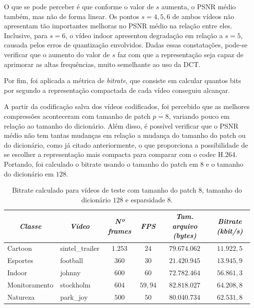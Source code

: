 \documentclass[cic,tc]{iiufrgs}
\begin{document}
O que se pode perceber é que conforme o valor de $s$ aumenta, o PSNR médio também, 
mas não de forma linear.
Os pontos $s=4,5,6$ de ambos vídeos não apresentam tão importantes melhoras no 
PSNR médio na relação entre eles. 
Inclusive, para $s=6$, o vídeo indoor apresentou degradação em relação a $s=5$, 
causada pelos erros de quantização envolvidos.
Dadas essas constatações, pode-se verificar que o aumento do valor de $s$ faz com 
que a representação seja capaz de aprimorar as altas frequências, muito semelhante 
ao uso da DCT.

Por fim, foi aplicada a métrica de \emph{bitrate},
que consiste em calcular quantos bits por segundo a representação compactada 
de cada vídeo conseguiu alcançar.

A partir da codificação salva dos vídeos codificados,
foi percebido que as melhores compressões aconteceram com tamanho de patch $p=8$, 
variando pouco em relação ao tamanho do dicionário.
Além disso, é possível verificar que o PSNR médio não tem tantas mudanças em relação 
a mudança do tamanho do patch ou do dicionário, como já citado anteriormente,
o que proporciona a possibilidade de se escolher a representação mais compacta para 
comparar com o codec H.264.
Portando, foi calculado o bitrate usando o tamanho do patch em $8$ e o tamanho do dicionário
em $128$.

\begin{table}[h]
    \caption{Bitrate calculado para vídeos de teste com tamanho do patch $8$, tamanho do 
    dicionário $128$ e esparsidade $8$.}
    \centering
        \begin{tabular}{|l|l|c|c|c|c|}
          \hline
          \multicolumn{1}{|c}{\textit{Classe}} & 
          \multicolumn{1}{|c}{\textit{Vídeo}} & 
          \multicolumn{1}{|c}{\textit{Nº frames}} & 
          \multicolumn{1}{|c}{\textit{FPS}} & 
          \multicolumn{1}{|c}{\textit{Tam. arquivo (bytes)}} & 
          \multicolumn{1}{|c|}{\textit{Bitrate (kbit/s)}} \\
          \hline
          \hline
          Cartoon & sintel\_trailer & $1.253$ & $24$ & $79.674.062$ & $11.922,5$ \\
          Esportes & football &  $360$ & $30$ & $21.420.945$ & $13.945,9$ \\
          Indoor & johnny  &   $600$ & $60$ & $72.782.464$ & $56.861,3$ \\
          Monitoramento & stockholm & $604$ & $59,94$ & $82.818.027$ & $64.208,8$ \\
          Natureza & park\_joy & $500$ & $50$ & $80.040.734$ & $62.531,8$ \\
          \hline
        \end{tabular}
    \label{tbl:bitrate}
\end{table}
\end{document}
